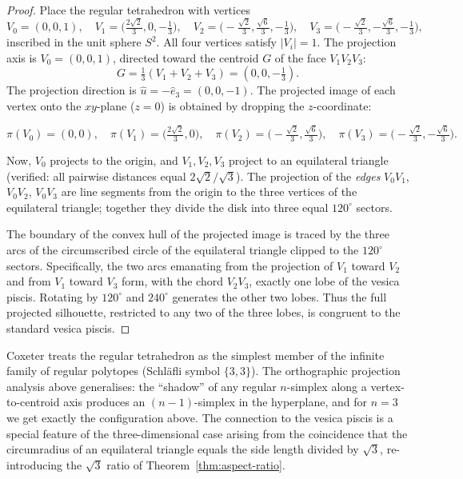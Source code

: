 \begin{proof}
Place the regular tetrahedron with vertices
\[
  V_0 = (0, 0, 1), \quad
  V_1 = \bigl(\tfrac{2\sqrt{2}}{3}, 0, -\tfrac{1}{3}\bigr), \quad
  V_2 = \bigl(-\tfrac{\sqrt{2}}{3}, \tfrac{\sqrt{6}}{3}, -\tfrac{1}{3}\bigr), \quad
  V_3 = \bigl(-\tfrac{\sqrt{2}}{3}, -\tfrac{\sqrt{6}}{3}, -\tfrac{1}{3}\bigr),
\]
inscribed in the unit sphere \(S^2\).
All four vertices satisfy \(|V_i| = 1\).
The projection axis is \(V_0 = (0,0,1)\), directed toward the centroid
\(G\) of the face \(V_1 V_2 V_3\):
\[
  G = \tfrac{1}{3}(V_1 + V_2 + V_3) = (0, 0, -\tfrac{1}{3}).
\]
The projection direction is \(\hat{u} = -\hat{e}_3 = (0,0,-1)\).
The projected image of each vertex onto the \(xy\)-plane (\(z=0\)) is
obtained by dropping the \(z\)-coordinate:

\[
  \pi(V_0) = (0,0), \quad
  \pi(V_1) = \bigl(\tfrac{2\sqrt{2}}{3}, 0\bigr), \quad
  \pi(V_2) = \bigl(-\tfrac{\sqrt{2}}{3}, \tfrac{\sqrt{6}}{3}\bigr), \quad
  \pi(V_3) = \bigl(-\tfrac{\sqrt{2}}{3}, -\tfrac{\sqrt{6}}{3}\bigr).
\]

Now, \(V_0\) projects to the origin, and \(V_1, V_2, V_3\) project to an
equilateral triangle (verified: all pairwise distances equal
\(2\sqrt{2}/\sqrt{3}\)).
The projection of the \emph{edges} \(V_0 V_1\), \(V_0 V_2\), \(V_0 V_3\)
are line segments from the origin to the three vertices of the equilateral
triangle; together they divide the disk into three equal \(120^\circ\)
sectors.

The boundary of the convex hull of the projected image is traced by
the three arcs of the circumscribed circle of the equilateral triangle
clipped to the \(120^\circ\) sectors.
Specifically, the two arcs emanating from the projection of \(V_1\)
toward \(V_2\) and from \(V_1\) toward \(V_3\) form, with the chord
\(V_2 V_3\), exactly one lobe of the vesica piscis.
Rotating by \(120^\circ\) and \(240^\circ\) generates the other two
lobes.
Thus the full projected silhouette, restricted to any two of the three
lobes, is congruent to the standard vesica piscis.
\end{proof}

\begin{remark}
Coxeter \cite{coxeter_regular_polytopes} treats the regular tetrahedron
as the simplest member of the infinite family of regular polytopes
(Schläfli symbol \(\{3,3\}\)).
The orthographic projection analysis above generalises: the
``shadow'' of any regular \(n\)-simplex along a vertex-to-centroid axis
produces an \((n-1)\)-simplex in the hyperplane, and for \(n=3\) we get
exactly the configuration above.
The connection to the vesica piscis is a special feature of the
three-dimensional case arising from the coincidence that the circumradius
of an equilateral triangle equals the side length divided by \(\sqrt{3}\),
re-introducing the \(\sqrt{3}\) ratio of Theorem~\ref{thm:aspect-ratio}.
\end{remark}

